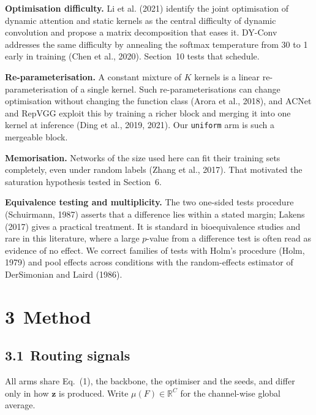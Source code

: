 \documentclass{article}
\begin{document}
\textbf{Optimisation difficulty.}  Li et al. (2021) identify the joint
optimisation of dynamic attention and static kernels as the central
difficulty of dynamic convolution and propose a matrix decomposition that
eases it. DY-Conv addresses the same difficulty by annealing the softmax
temperature from 30 to 1 early in training (Chen et al., 2020).
Section~10 tests that schedule.

\textbf{Re-parameterisation.}  A constant mixture of $K$ kernels is a
linear re-parameterisation of a single kernel. Such re-parameterisations
can change optimisation without changing the function class
(Arora et al., 2018), and ACNet and RepVGG exploit this by
training a richer block and merging it into one kernel at inference
(Ding et al., 2019, 2021). Our \texttt{uniform} arm is such a
mergeable block.

\textbf{Memorisation.}  Networks of the size used here can fit their
training sets completely, even under random labels (Zhang et al., 2017).
That motivated the saturation hypothesis tested in Section~6.

\textbf{Equivalence testing and multiplicity.}  The two one-sided tests
procedure (Schuirmann, 1987) asserts that a difference lies within a
stated margin; Lakens (2017) gives a practical treatment. It is
standard in bioequivalence studies and rare in this literature, where a
large $p$-value from a difference test is often read as evidence of no
effect. We correct families of tests with Holm's procedure (Holm, 1979)
and pool effects across conditions with the random-effects estimator of
DerSimonian and Laird (1986).

\section*{3 Method}

\subsection*{3.1 Routing signals}

All arms share Eq.~(1), the backbone, the optimiser and the
seeds, and differ only in how $\mathbf{z}$ is produced. Write
$\mu(F)\in\mathbb{R}^{C}$ for the channel-wise global average.
\end{document}
